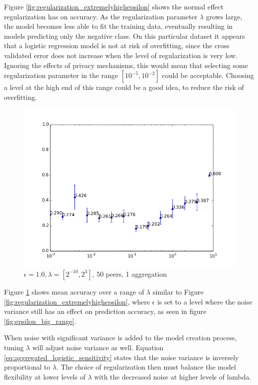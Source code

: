 Figure \ref{fig:regularization_extremelyhighepsilon} shows the normal effect regularization has on accuracy. As the regularization parameter $\lambda$ grows large, the model becomes less able to fit the training data, eventually resulting in models predicting only \unsure the negative class. On this particular dataset it appears that a logistic regression model is not at risk of overfitting, since the cross validated error does not increase when the level of regularization is very low. Ignoring the effects of privacy mechanisms, this would mean that selecting some regularization parameter in the range $[10^{-5},10^{-2}]$ could be acceptable. Choosing a level at the high end of this range could be a good idea, to reduce the risk of overfitting.


\begin{figure}[h!]
	\centering
	\includegraphics[width=\textwidth]{fig/eps1.0,bud1.0,peers50,groups50,reg2e-10-2e3}
	\caption{$\epsilon = 1.0, \lambda = [2^{-10}, 2^{3}]$, 50 peers, 1 aggregation}
	\label{fig:regularization_normalepsilon}
\end{figure}

Figure \ref{fig:regularization_normalepsilon} shows mean accuracy over a range of $\lambda$ similar to Figure \ref{fig:regularization_extremelyhighepsilon}, where $\epsilon$ is set to a level where the noise variance still has an effect on prediction accuracy, as seen in figure \ref{fig:epsilon_big_range}.

When noise with significant variance is added to the model creation process, tuning $\lambda$ will adjust noise variance as well. Equation \ref{eq:aggregated_logistic_sensitivity} states that the noise variance is inversely proportional to $\lambda$. The choice of regularization then must balance the model flexibility at lower levels of $\lambda$ with the decreased noise at higher levels of lambda.

